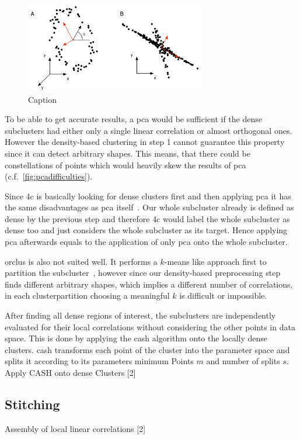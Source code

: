 \begin{figure}
    \centering
    \includegraphics[width=0.7\textwidth]{figures/PCAdifficulties.png}
    \caption{Caption\cite{PCAshlens2014tutorial}}
    \label{fig:pcadifficulties}
\end{figure}

To be able to get accurate results, a \gls{pca} would be sufficient if the dense subclusters had either only a single linear correlation or almost orthogonal ones. However the density-based clustering in step 1 cannot guarantee this property since it can detect arbitrary shapes. This means, that there could be constellations of points which would heavily skew the results of \gls{pca} (c.f.~\autoref{fig:pcadifficulties})\cite{PCAshlens2014tutorial}. 

Since \gls{4c} is basically looking for dense clusters first and then applying \gls{pca} it has the same disadvantages as \gls{pca} itself~\cite{4cbohm2004computing}. Our whole subcluster already is defined as dense by the previous step and therefore \gls{4c} would label the whole subcluster as dense too and just considers the whole subcluster as its target. Hence applying \gls{pca} afterwards equals to the application of only \gls{pca} onto the whole subcluster. 

\gls{orclus} is also not suited well. It performs a $k$-means like approach first to partition the subcluster~\cite{orclusaggarwal2000finding}, however since our density-based preprocessing step finds different arbitrary shapes, which implies a different number of correlations, in each clusterpartition choosing a meaningful $k$ is difficult or impossible. 




After finding all dense regions of interest, the subclusters are independently evaluated for their local correlations without considering the other points in data space. This is done by applying the \gls{cash} algorithm onto the locally dense clusters. \gls{cash} transforms each point of the cluster into the parameter space and splits it according to its parameters minimum Points $m$ and number of splits $s$. 
Apply CASH onto dense Clusters [2]

\subsection{Stitching}

Assembly of local linear correlations [2]
